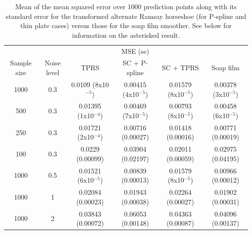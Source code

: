 \begin{table}[ht]
\begin{tabular}{c c c c c c}\\
& & & MSE (se) &\\
Sample size & Noise level & TPRS & SC + P-spline& SC + TPRS & Soap film\\
\hline
\hline
1000 & 0.3 & 0.0109 (8x10$^{-5}$) & 0.00415 (4x10$^{-5}$) & 0.01579 (8x10$^{-5}$) & 0.00378 (3x10$^{-5}$) \\ 
500 & 0.3 & 0.01395 (1x10$^{-4}$) & 0.00469 (7x10$^{-5}$) & 0.00793 (8x10$^{-5}$) & 0.00458 (6x10$^{-5}$) \\ 
250 & 0.3 & 0.01721 (2x10$^{-4}$) & 0.00716 (0.00027) & 0.01418 (0.00016) & 0.00771 (0.00019) \\ 
100 & 0.3 & 0.0229 (0.00099) & 0.03904 (0.02197) & 0.02011 (0.00059) & 0.02975 (0.04195) \\ 
1000 & 0.5 & 0.01521 (6x10$^{-5}$) & 0.00839 (0.00013) & 0.01579 (8x10$^{-5}$) & 0.00966 (0.00012) \\ 
1000 & 1 & 0.02084 (0.00023) & 0.01943 (0.00038) & 0.02264 (0.00027) & 0.01902 (0.00031) \\ 
1000 & 2 & 0.03843 (0.00072) & 0.06053 (0.00148) & 0.04363 (0.00087) & 0.04096 (0.00137) \\ 
\end{tabular}
\label{scaltramsayresultstable}
\caption{Mean of the mean squared error over 1000 prediction points along with its standard error for the transformed alternate Ramsay horseshoe (for P-spline and thin plate cases) versus those for the soap film smoother. See below for information on the asterisked result.}
\end{table}

